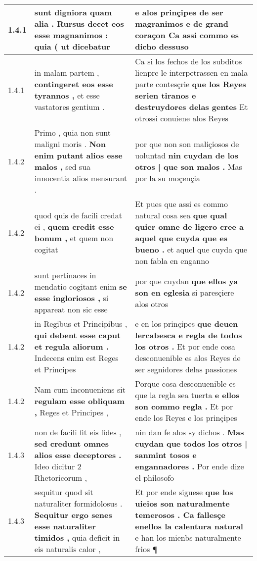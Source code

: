 \begin{tabular}{|p{1cm}|p{6.5cm}|p{6.5cm}|}
1.4.1 & sunt digniora quam alia . \textbf{ Rursus decet eos esse magnanimos : } quia ( ut dicebatur & e alos prinçipes de ser magranimos \textbf{ e de grand coraçon } Ca assi commo es dicho dessuso \\\hline
1.4.1 & in malam partem , \textbf{ contingeret eos esse tyrannos , } et esse vastatores gentium . & Ca si los fechos de los subditos lienpre le interpetrassen en mala parte contesçrie \textbf{ que los Reyes serien tiranos e destruydores delas gentes } Et otrossi conuiene alos Reyes \\\hline
1.4.2 & Primo , quia non sunt maligni moris . \textbf{ Non enim putant alios esse malos , } sed sua innocentia alios mensurant . & por que non son maliçiosos de uoluntad \textbf{ nin cuydan de los otros | que son malos . } Mas por la su moçençia \\\hline
1.4.2 & quod quis de facili credat ei , \textbf{ quem credit esse bonum , } et quem non cogitat & Et pues que assi es commo natural cosa sea \textbf{ que qual quier omne de ligero cree a aquel que cuyda que es bueno . } et aquel que cuyda que non fabla en enganno \\\hline
1.4.2 & sunt pertinaces in mendatio cogitant enim \textbf{ se esse ingloriosos , } si appareat non sic esse & por que cuydan \textbf{ que ellos ya son en eglesia } si paresçiere alos otros \\\hline
1.4.2 & in Regibus et Principibus , \textbf{ qui debent esse caput et regula aliorum . } Indecens enim est Reges et Principes & e en los prinçipes \textbf{ que deuen lercabesca e regla de todos los otros . } Et por ende cosa desconuenible es alos Reyes de ser segnidores delas passiones \\\hline
1.4.2 & Nam cum inconueniens sit \textbf{ regulam esse obliquam , } Reges et Principes , & Porque cosa desconuenible es que la regla sea tuerta \textbf{ e ellos son commo regla . } Et por ende los Reyes e los prinçipes \\\hline
1.4.3 & non de facili fit eis fides , \textbf{ sed credunt omnes alios esse deceptores . } Ideo dicitur 2 Rhetoricorum , & nin dan fe alos sy dichos . \textbf{ Mas cuydan que todos los otros | sanmint tosos e engannadores . } Por ende dize el philosofo \\\hline
1.4.3 & sequitur quod sit naturaliter formidolosus . \textbf{ Sequitur ergo senes esse naturaliter timidos , } quia deficit in eis naturalis calor , & Et por ende siguese \textbf{ que los uieios son naturalmente temerosos . Ca fallesçe enellos la calentura natural } e han los mienbs naturalmente frios ¶ \\\hline

\end{tabular}
